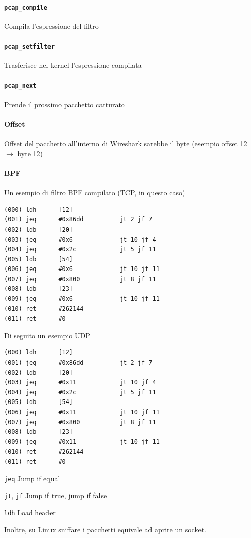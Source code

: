 \documentclass[10pt]{book}
\begin{document}
\paragraph{\texttt{pcap\_compile}} Compila l'espressione del filtro
\paragraph{\texttt{pcap\_setfilter}} Trasferisce nel kernel l'espressione compilata
\paragraph{\texttt{pcap\_next}} Prende il prossimo pacchetto catturato
\paragraph{Offset} Offset del pacchetto all'interno di Wireshark sarebbe il byte (esempio offset 12 $\rightarrow$ byte 12)
\paragraph{BPF} Un esempio di filtro BPF compilato (TCP, in questo caso) \begin{lstlisting}
(000) ldh      [12]
(001) jeq      #0x86dd          jt 2 jf 7
(002) ldb      [20]
(003) jeq      #0x6             jt 10 jf 4
(004) jeq      #0x2c            jt 5 jf 11
(005) ldb      [54]
(006) jeq      #0x6             jt 10 jf 11
(007) jeq      #0x800           jt 8 jf 11
(008) ldb      [23]
(009) jeq      #0x6             jt 10 jf 11
(010) ret      #262144
(011) ret      #0
\end{lstlisting}
Di seguito un esempio UDP \begin{lstlisting}
(000) ldh      [12]
(001) jeq      #0x86dd          jt 2 jf 7
(002) ldb      [20]
(003) jeq      #0x11            jt 10 jf 4
(004) jeq      #0x2c            jt 5 jf 11
(005) ldb      [54]
(006) jeq      #0x11            jt 10 jf 11
(007) jeq      #0x800           jt 8 jf 11
(008) ldb      [23]
(009) jeq      #0x11            jt 10 jf 11
(010) ret      #262144
(011) ret      #0
\end{lstlisting}
\begin{list}{}{}
	\item \texttt{jeq} Jump if equal
	\item \texttt{jt}, \texttt{jf} Jump if true, jump if false
	\item \texttt{ldh} Load header
\end{list}
Inoltre, su Linux sniffare i pacchetti equivale ad aprire un socket.
\end{document}
